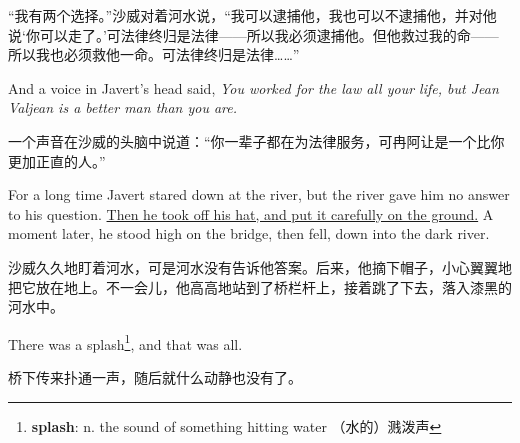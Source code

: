 \documentclass[fontset=ubuntu, zihao=5]{ctexart}
\begin{document}
\begin{paracol}{2}
\switchcolumn

“我有两个选择。”沙威对着河水说，“我可以逮捕他，我也可以不逮捕他，并对他说‘你可以走了。’可法律终归是法律——所以我必须逮捕他。但他救过我的命——所以我也必须救他一命。可法律终归是法律……”

\switchcolumn*

And a voice in Javert's head said, \emph{You worked for the law all your life, but Jean Valjean is a better man than you are.}

\switchcolumn

一个声音在沙威的头脑中说道：“你一辈子都在为法律服务，可冉阿让是一个比你更加正直的人。”
\switchcolumn*

For a long time Javert stared down at the river, but the river gave him no answer to his question. \uline{Then he took off his hat, and put it carefully on the ground.} A moment later, he stood high on the bridge, then fell, down into the dark river.

\switchcolumn

沙威久久地盯着河水，可是河水没有告诉他答案。后来，他摘下帽子，小心翼翼地把它放在地上。不一会儿，他高高地站到了桥栏杆上，接着跳了下去，落入漆黑的河水中。

\switchcolumn*

There was a splash\footnote{\textbf{splash}: n. the sound of something
  hitting water （水的）溅泼声}, and that was all.

\switchcolumn

桥下传来扑通一声，随后就什么动静也没有了。

\end{paracol}

\clearpage
\end{document}
